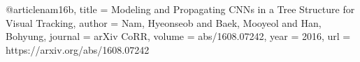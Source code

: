 @article{nam16b,
  title   = {{M}odeling and {P}ropagating {CNN}s in a {T}ree 
             {S}tructure for {V}isual {T}racking},
  author  = {Nam, Hyeonseob and Baek, Mooyeol and Han, Bohyung},
  journal = {arXiv CoRR},
  volume  = {abs/1608.07242},
  year    = {2016},
  url     = {https://arxiv.org/abs/1608.07242}
}
